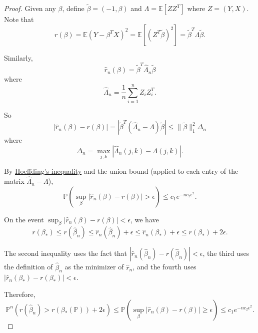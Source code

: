   \begin{proof}
    Given any $\beta$, define $\tilde{\beta} = (-1, \beta)$ and $\Lambda = \mathbb{E}[ZZ^T]$ where $Z = (Y, X)$. Note that
    \begin{equation}
     r(\beta) = \mathbb{E}(Y - \beta^T X)^2 = \mathbb{E}[(Z^T \tilde{\beta})^2] = \tilde{\beta}^T \Lambda \tilde{\beta}.
    \end{equation}

    Similarly,
    \begin{equation}
     \hat{r}_n(\beta) = \tilde{\beta}^T \hat{\Lambda}_n \tilde{\beta}
    \end{equation}
    where
    \begin{equation}
     \hat{\Lambda}_n = \frac{1}{n} \sum_{i=1}^n Z_i Z_i^T.
    \end{equation}

    So
    \begin{equation}
     |\hat{r}_n(\beta) - r(\beta)| = |\tilde{\beta}^T (\hat{\Lambda}_n - \Lambda) \tilde{\beta}| \leq \|\tilde{\beta}\|_1^2 \Delta_n
    \end{equation}
    where
    \begin{equation}
     \Delta_n = \max_{j,k} |\hat{\Lambda}_n(j,k) - \Lambda(j,k)|.
    \end{equation}

    By \hyperref[prob-thm:hoeffdings-inequality]{Hoeffding's inequality} and the union bound (applied to each entry of the matrix $\hat{\Lambda}_n - \Lambda$),
    \begin{equation}
     \mathbb{P}\left(\sup_{\beta} |\hat{r}_n(\beta) - r(\beta)| > \epsilon\right) \leq c_1 e^{-n c_2 \epsilon^2}.
    \end{equation}

    On the event $\sup_{\beta} |\hat{r}_n(\beta) - r(\beta)| < \epsilon$, we have
    \begin{equation}
     r(\beta_\ast) \leq r(\hat{\beta}_n) \leq \hat{r}_n(\hat{\beta}_n) + \epsilon \leq \hat{r}_n(\beta_\ast) + \epsilon \leq r(\beta_\ast) + 2\epsilon.
    \end{equation}

    The second inequality uses the fact that $|\hat{r}_n(\hat{\beta}_n) - r(\hat{\beta}_n)| < \epsilon$, the third uses the definition of $\hat{\beta}_n$ as the minimizer of $\hat{r}_n$, and the fourth uses $|\hat{r}_n(\beta_\ast) - r(\beta_\ast)| < \epsilon$.

    Therefore,
    \begin{equation}
     \mathbb{P}^n(r(\hat{\beta}_n) > r(\beta_\ast(\mathbb{P})) + 2\epsilon) \leq \mathbb{P}\left(\sup_{\beta} |\hat{r}_n(\beta) - r(\beta)| \geq \epsilon\right) \leq c_1 e^{-n c_2 \epsilon^2}.
    \end{equation}


\end{proof}
